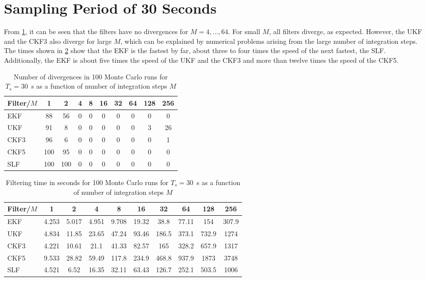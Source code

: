 \documentclass[../zhang_thesis.tex]{subfiles}
\begin{document}
\section{Sampling Period of 30 Seconds}

From \cref{tab:div_30}, it can be seen that the filters have no divergences for $M=4,\dots,64$. For small $M$, all filters diverge, as expected. However, the UKF and the CKF3 also diverge for large $M$, which can be explained by numerical problems arising from the large number of integration steps. The times shown in \cref{tab:time_30} show that the EKF is the fastest by far, about three to four times the speed of the next fastest, the SLF. Additionally, the EKF is about five times the speed of the UKF and the CKF3 and more than twelve times the speed of the CKF5. 

\begin{table}[h]
\centering
\caption{Number of divergences in 100 Monte Carlo runs for $T_s=30$~s as a function of number of integration steps $M$}
\begin{tabular}{@{}l*{9}{c}@{}}
\toprule
Filter/$M$ & 1   & 2   & 4 & 8 & 16 & 32 & 64 & 128 & 256 \\
\midrule
EKF        & 88  & 56  & 0 & 0 & 0  & 0 & 0 & 0 & 0   \\
UKF        & 91  & 8   & 0 & 0 & 0  & 0 & 0 & 3 & 26  \\
CKF3       & 96  & 6   & 0 & 0 & 0  & 0 & 0 & 0 & 1   \\
CKF5       & 100 & 95  & 0 & 0 & 0  & 0 & 0 & 0 & 0   \\
SLF        & 100 & 100 & 0 & 0 & 0  & 0 & 0 & 0 & 0   \\
\bottomrule
\end{tabular}
\label{tab:div_30}
\end{table}

\begin{table}[h]
\centering
\caption{Filtering time in seconds for 100 Monte Carlo runs for $T_s=30$~s as a function of number of integration steps $M$}
\begin{tabular}{@{}lccccccccc@{}}
\toprule
Filter/$M$ & 1     & 2     & 4     & 8     & 16    & 32    & 64    & 128   & 256   \\ \midrule
EKF        & 4.253 & 5.017 & 4.951 & 9.708 & 19.32 & 38.8  & 77.11 & 154   & 307.9 \\
UKF        & 4.834 & 11.85 & 23.65 & 47.24 & 93.46 & 186.5 & 373.1 & 732.9 & 1274  \\
CKF3       & 4.221 & 10.61 & 21.1  & 41.33 & 82.57 & 165   & 328.2 & 657.9 & 1317  \\
CKF5       & 9.533 & 28.82 & 59.49 & 117.8 & 234.9 & 468.8 & 937.9 & 1873  & 3748  \\
SLF        & 4.521 & 6.52  & 16.35 & 32.11 & 63.43 & 126.7 & 252.1 & 503.5 & 1006  \\ \bottomrule
\end{tabular}
\label{tab:time_30}
\end{table}
\end{document}
